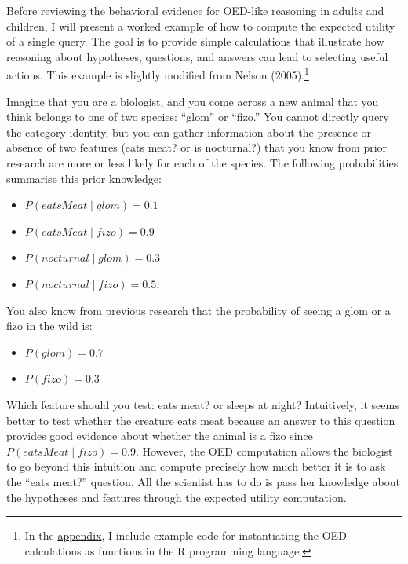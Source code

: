 \documentclass[english,floatsintext,man]{apa6}
\providecommand{\tightlist}{%
  \setlength{\itemsep}{0pt}\setlength{\parskip}{0pt}}
\theoremstyle{definition}
\theoremstyle{definition}
\theoremstyle{definition}
\theoremstyle{remark}
\begin{document}
Before reviewing the behavioral evidence for OED-like reasoning in
adults and children, I will present a worked example of how to compute
the expected utility of a single query. The goal is to provide simple
calculations that illustrate how reasoning about hypotheses, questions,
and answers can lead to selecting useful actions. This example is
slightly modified from Nelson (2005).\footnote{In the
  \protect\hyperlink{app}{appendix}, I include example code for
  instantiating the OED calculations as functions in the R programming
  language.}

Imagine that you are a biologist, and you come across a new animal that
you think belongs to one of two species: \enquote{glom} or
\enquote{fizo.} You cannot directly query the category identity, but you
can gather information about the presence or absence of two features
(eats meat? or is nocturnal?) that you know from prior research are more
or less likely for each of the species. The following probabilities
summarise this prior knowledge:

\begin{itemize}
\tightlist
\item
  \(P(eatsMeat \mid glom) = 0.1\)\\
\item
  \(P(eatsMeat \mid fizo) = 0.9\)
\item
  \(P(nocturnal \mid glom) = 0.3\)\\
\item
  \(P(nocturnal \mid fizo) = 0.5\).
\end{itemize}

\noindent   You also know from previous research that the probability of
seeing a glom or a fizo in the wild is:

\begin{itemize}
\tightlist
\item
  \(P(glom) = 0.7\)
\item
  \(P(fizo) = 0.3\)
\end{itemize}

\noindent   Which feature should you test: eats meat? or sleeps at
night? Intuitively, it seems better to test whether the creature eats
meat because an answer to this question provides good evidence about
whether the animal is a fizo since \(P(eatsMeat \mid fizo) = 0.9\).
However, the OED computation allows the biologist to go beyond this
intuition and compute precisely how much better it is to ask the
\enquote{eats meat?} question. All the scientist has to do is pass her
knowledge about the hypotheses and features through the expected utility
computation.
\end{document}

